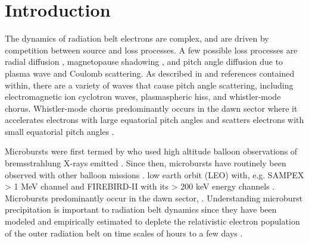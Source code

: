\documentclass[draft, linenumbers]{agujournal}
\begin{document}
\section{Introduction}\label{Intro}
The dynamics of radiation belt electrons are complex, and are driven by competition between source and loss processes. A few possible loss processes are radial diffusion \citep{Shprits2004}, magnetopause shadowing \citep{Ukhorskiy2006}, and pitch angle diffusion \citep{Selesnick2003, Abel1998_1} due to plasma wave and Coulomb scattering. As described in \citep{Millan2007, Thorne2010} and references contained within, there are a variety of waves that cause pitch angle scattering, including electromagnetic ion cyclotron waves, plasmaspheric hiss, and whistler-mode chorus. Whistler-mode chorus predominantly occurs in the dawn sector \citep{Li2009} where it accelerates electrons with large equatorial pitch angles and scatters electrons with small equatorial pitch angles \citep{Horne2003}. 

Microbursts were first termed by \citet{Anderson1964} who used high altitude balloon observations of bremsstrahlung X-rays emitted . Since then, microbursts have routinely been observed with other balloon missions \citep{Parks1967, Woodger2015, Anderson2017}.   low earth orbit (LEO) with, e.g.  SAMPEX > 1 MeV  channel \citep{Nakamura1995, Nakamura2000, Blake1996, Lorentzen2001a, Lorentzen2001b, O'Brien2003, O'Brien2004, Blum2015} and FIREBIRD-II with its > 200 keV energy channels \citep{Crew2016, Breneman2017}.  Microbursts  predominantly occur in the dawn sector, . Understanding microburst precipitation is important to radiation belt dynamics since they have been modeled and empirically estimated to deplete the relativistic electron population of the outer radiation belt on time scales of hours to a few days \citep{O'Brien2004, Thorne2005, Shprits2007, Breneman2017}. 
\end{document}

